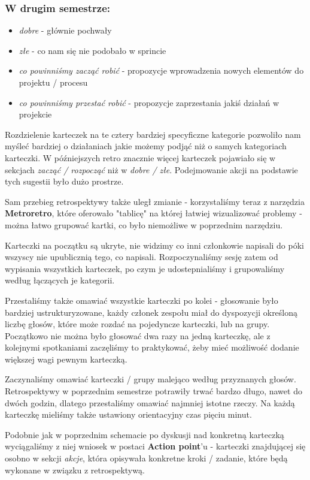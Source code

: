 \documentclass{article}
\begin{document}
\subsubsection*{W drugim semestrze:}
\begin{itemize}
    \item \textit{dobre} - głównie pochwały
    \item \textit{złe} - co nam się nie podobało w sprincie
    \item \textit{co powinniśmy zacząć robić} - propozycje wprowadzenia nowych elementów do projektu / procesu
    \item \textit{co powinniśmy przestać robić} - propozycje zaprzestania jakiś działań w projekcie
\end{itemize}
Rozdzielenie karteczek na te cztery bardziej specyficzne kategorie pozwoliło nam myśleć bardziej o działaniach jakie możemy podjąć niż o samych kategoriach karteczki. W późniejszych retro znacznie więcej karteczek pojawiało się w sekcjach \textit{zacząć / rozpocząć} niż w \textit{dobre / złe}. Podejmowanie akcji na podstawie tych sugestii było dużo prostrze.

Sam przebieg retrospektywy także uległ zmianie - korzystaliśmy teraz z narzędzia \textbf{Metroretro}, które oferowało "tablicę" na której łatwiej wizualizować problemy - można łatwo grupować kartki, co było niemożliwe w poprzednim narzędziu.

Karteczki na początku są ukryte, nie widzimy co inni członkowie napisali do póki wszyscy nie upublicznią tego, co napisali. Rozpoczynaliśmy sesję zatem od wypisania wszystkich karteczek, po czym je udostepnialiśmy i grupowaliśmy według łączących je kategorii.

Przestaliśmy także omawiać wszystkie karteczki po kolei - głosowanie było bardziej ustrukturyzowane, każdy członek zespołu miał do dyspozycji określoną liczbę głosów, które może rozdać na pojedyncze karteczki, lub na grupy. Początkowo nie można było głosować dwa razy na jedną karteczkę, ale z kolejnymi spotkaniami zaczęliśmy to praktykować, żeby mieć możliwość dodanie większej wagi pewnym karteczką.

Zaczynaliśmy omawiać karteczki / grupy malejąco według przyznanych głosów. Retrospektywy w poprzednim semestrze potrawiły trwać bardzo długo, nawet do dwóch godzin, dlatego przestaliśmy omawiać najmniej istotne rzeczy. Na każdą karteczkę mieliśmy także ustawiony orientacyjny czas pięciu minut.

Podobnie jak w poprzednim schemacie po dyskusji nad konkretną karteczką wyciągaliśmy z niej wniosek w postaci \textbf{Action point}'u - karteczki znajdującej się osobno w sekcji \textit{akcje}, która opisywała konkretne kroki / zadanie, które będą wykonane w związku z retrospektywą.
\end{document}
